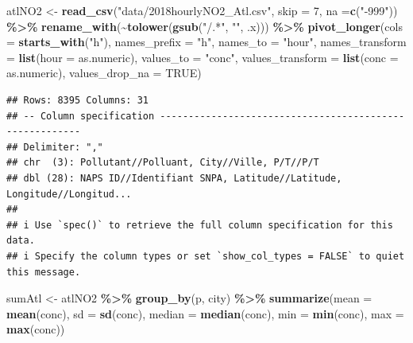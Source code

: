 \documentclass[
]{book}
\newenvironment{Shaded}{\begin{snugshade}}{\end{snugshade}}
\newcommand{\AttributeTok}[1]{\textcolor[rgb]{0.13,0.29,0.53}{#1}}
\newcommand{\ConstantTok}[1]{\textcolor[rgb]{0.56,0.35,0.01}{#1}}
\newcommand{\DecValTok}[1]{\textcolor[rgb]{0.00,0.00,0.81}{#1}}
\newcommand{\FunctionTok}[1]{\textcolor[rgb]{0.13,0.29,0.53}{\textbf{#1}}}
\newcommand{\NormalTok}[1]{#1}
\newcommand{\OtherTok}[1]{\textcolor[rgb]{0.56,0.35,0.01}{#1}}
\newcommand{\SpecialCharTok}[1]{\textcolor[rgb]{0.81,0.36,0.00}{\textbf{#1}}}
\newcommand{\StringTok}[1]{\textcolor[rgb]{0.31,0.60,0.02}{#1}}
\begin{document}
\begin{Shaded}
\begin{Highlighting}[]
\NormalTok{atlNO2 }\OtherTok{\textless{}{-}} \FunctionTok{read\_csv}\NormalTok{(}\StringTok{"data/2018hourlyNO2\_Atl.csv"}\NormalTok{, }\AttributeTok{skip =} \DecValTok{7}\NormalTok{, }\AttributeTok{na =}\FunctionTok{c}\NormalTok{(}\StringTok{"{-}999"}\NormalTok{)) }\SpecialCharTok{\%\textgreater{}\%}
  \FunctionTok{rename\_with}\NormalTok{(}\SpecialCharTok{\textasciitilde{}}\FunctionTok{tolower}\NormalTok{(}\FunctionTok{gsub}\NormalTok{(}\StringTok{"/.*"}\NormalTok{, }\StringTok{""}\NormalTok{, .x))) }\SpecialCharTok{\%\textgreater{}\%}
  \FunctionTok{pivot\_longer}\NormalTok{(}\AttributeTok{cols =} \FunctionTok{starts\_with}\NormalTok{(}\StringTok{"h"}\NormalTok{), }
               \AttributeTok{names\_prefix =} \StringTok{"h"}\NormalTok{, }
               \AttributeTok{names\_to =} \StringTok{"hour"}\NormalTok{, }
               \AttributeTok{names\_transform =} \FunctionTok{list}\NormalTok{(}\AttributeTok{hour =}\NormalTok{ as.numeric),}
               \AttributeTok{values\_to =} \StringTok{"conc"}\NormalTok{, }
               \AttributeTok{values\_transform =} \FunctionTok{list}\NormalTok{(}\AttributeTok{conc =}\NormalTok{ as.numeric),}
               \AttributeTok{values\_drop\_na =} \ConstantTok{TRUE}\NormalTok{) }
\end{Highlighting}
\end{Shaded}

\begin{verbatim}
## Rows: 8395 Columns: 31
## -- Column specification --------------------------------------------------------
## Delimiter: ","
## chr  (3): Pollutant//Polluant, City//Ville, P/T//P/T
## dbl (28): NAPS ID//Identifiant SNPA, Latitude//Latitude, Longitude//Longitud...
## 
## i Use `spec()` to retrieve the full column specification for this data.
## i Specify the column types or set `show_col_types = FALSE` to quiet this message.
\end{verbatim}

\begin{Shaded}
\begin{Highlighting}[]
\NormalTok{sumAtl }\OtherTok{\textless{}{-}}\NormalTok{ atlNO2 }\SpecialCharTok{\%\textgreater{}\%}
  \FunctionTok{group\_by}\NormalTok{(p, city) }\SpecialCharTok{\%\textgreater{}\%}
  \FunctionTok{summarize}\NormalTok{(}\AttributeTok{mean =} \FunctionTok{mean}\NormalTok{(conc), }
            \AttributeTok{sd =} \FunctionTok{sd}\NormalTok{(conc), }
            \AttributeTok{median =} \FunctionTok{median}\NormalTok{(conc), }
            \AttributeTok{min =} \FunctionTok{min}\NormalTok{(conc), }
            \AttributeTok{max =} \FunctionTok{max}\NormalTok{(conc))}
\end{Highlighting}
\end{Shaded}
\end{document}
